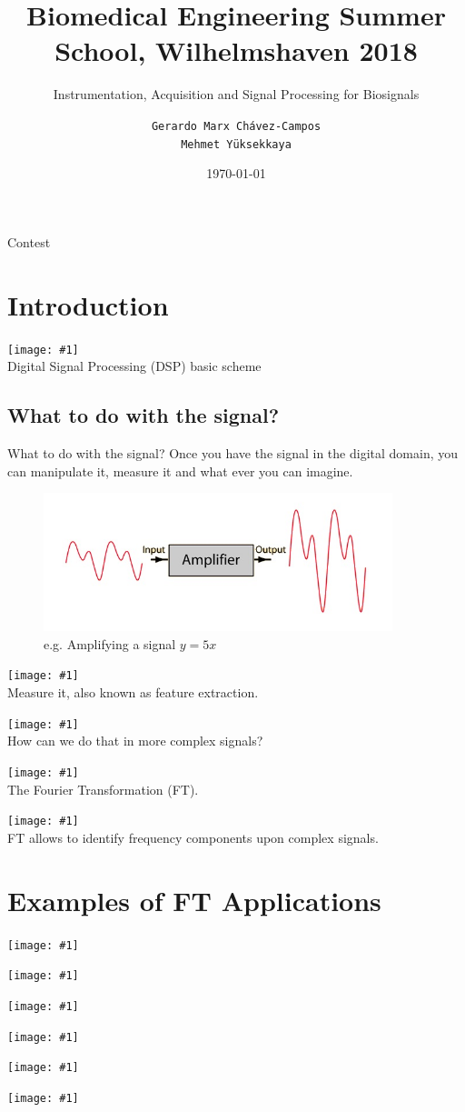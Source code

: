 \documentclass[newPxFont]{beamer}
\title{Biomedical Engineering Summer School, Wilhelmshaven 2018}
\subtitle{ Instrumentation, Acquisition and Signal Processing for Biosignals}
\date{\today}
\author{\texttt{Gerardo Marx Chávez-Campos\\ Mehmet Y\"uksekkaya}}
\institute{\textit{Instituto Tecnológico de Morelia}}
\newcommand \imageFrame[2]{
\begingroup
\begin{frame}
  \begin{center}
\texttt{[image: \#1]}\\
\Large #2
    \end{center}
\end{frame}
\endgroup
}
\begin{document}
\maketitle
\begin{frame}{Contest}
\tableofcontents[]
\end{frame}


\section{Introduction}
\imageFrame{signalProcessing}{Digital Signal Processing (DSP) basic scheme}
\subsection{What to do with the signal?}
\begin{frame}{What to do with the signal?}
Once you have the signal in the digital domain, you can manipulate it, measure
it and what ever you can imagine.
\begin{figure}
  \includegraphics[width=4in]{amp}
  \caption{e.g. Amplifying a signal $y=5 x$}
\end{figure}
\end{frame}
\imageFrame{measure}{Measure it, also known as feature extraction.}
\imageFrame{audio}{How can we do that in more complex signals?}
\imageFrame{fourierPicture}{The Fourier Transformation (FT).}
\imageFrame{ft}{FT allows to identify frequency components upon complex signals.}
\section{Examples of FT Applications}
\imageFrame{notchFT}{}
\imageFrame{qsr}{}
\imageFrame{image}{}
\imageFrame{xRayFT}{}
\imageFrame{tomography}{}
\imageFrame{ftMeme}{}
\end{document}
